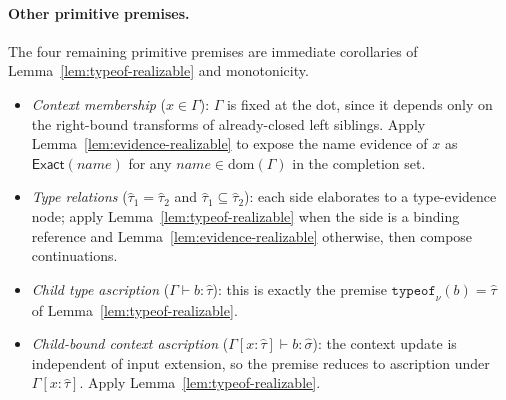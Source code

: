\paragraph{Other primitive premises.} The four remaining primitive premises are immediate corollaries of Lemma~\ref{lem:typeof-realizable} and monotonicity.
\begin{itemize}
	\item \emph{Context membership} ($x \in \Gamma$): $\Gamma$ is fixed at the dot, since it depends only on the right-bound transforms of already-closed left siblings. Apply Lemma~\ref{lem:evidence-realizable} to expose the name evidence of $x$ as $\mathsf{Exact}(\mathit{name})$ for any $\mathit{name} \in \mathrm{dom}(\Gamma)$ in the completion set.
	\item \emph{Type relations} ($\hat\tau_1 = \hat\tau_2$ and $\hat\tau_1 \subseteq \hat\tau_2$): each side elaborates to a type-evidence node; apply Lemma~\ref{lem:typeof-realizable} when the side is a binding reference and Lemma~\ref{lem:evidence-realizable} otherwise, then compose continuations.
	\item \emph{Child type ascription} ($\Gamma \vdash b : \hat\tau$): this is exactly the premise $\mathtt{typeof}_\nu(b) = \hat\tau$ of Lemma~\ref{lem:typeof-realizable}.
	\item \emph{Child-bound context ascription} ($\Gamma[x:\hat\tau] \vdash b : \hat\sigma$): the context update is independent of input extension, so the premise reduces to ascription under $\Gamma[x:\hat\tau]$. Apply Lemma~\ref{lem:typeof-realizable}.
\end{itemize}

